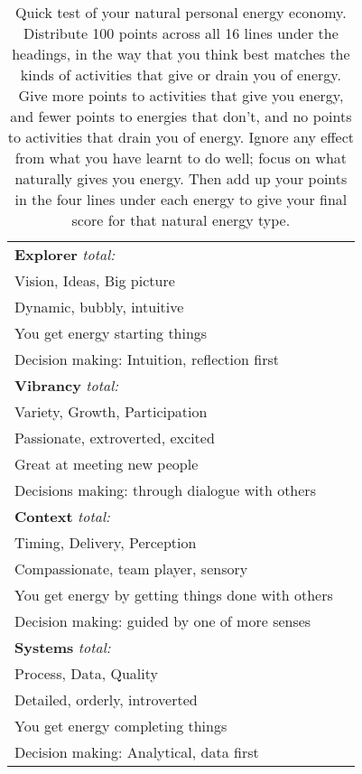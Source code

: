 \begin{table}[htbp]
        \centering
        \begin{tabular}{ L{0.70\textwidth}  L{0.10\textwidth}}
                \toprule
                \textbf{Explorer} \hfill \textit{total:}  &  \\ 
                Vision, Ideas, Big picture    &  \\ 
                Dynamic, bubbly, intuitive    &  \\ 
                You get energy starting things    &  \\ 
                Decision making: Intuition, reflection first    &  \\ 
                \addlinespace[.5em]
%         
                \textbf{Vibrancy} \hfill \textit{total:} & \\ 
                Variety, Growth, Participation     &  \\ 
                Passionate, extroverted, excited     &  \\ 
                Great at meeting new people    &  \\ 
                Decisions making: through dialogue with others    &  \\ 
                \addlinespace[.5em]        
%         
                \textbf{Context} \hfill \textit{total:} & \\ 
                Timing, Delivery, Perception    &  \\ 
                Compassionate, team player, sensory    &  \\ 
                You get energy by getting things done with others    &  \\ 
                Decision making: guided by one of more senses    &  \\ 
                \addlinespace[.5em]
%                 
                \textbf{Systems} \hfill \textit{total:} & \\ 
                Process, Data, Quality    &  \\ 
                Detailed, orderly, introverted    &  \\ 
                You get energy completing things   &  \\ 
                Decision making: Analytical, data first    &  \\
                \bottomrule
        \end{tabular} 
\caption[Personal energy economy]{Quick test of your natural personal energy economy. Distribute 100 points across all 16 lines under the headings, in the way that you think best matches the kinds of activities that give or drain you of energy. Give more points to activities that give you energy, and fewer points to energies that don't, and no points to activities that drain you of energy. Ignore any effect from what you have learnt to do well; focus on what naturally gives you energy. Then add up your points in the four lines under each energy to give your final score for that natural energy type.}
\label{table:simple-PEE}
\end{table}


